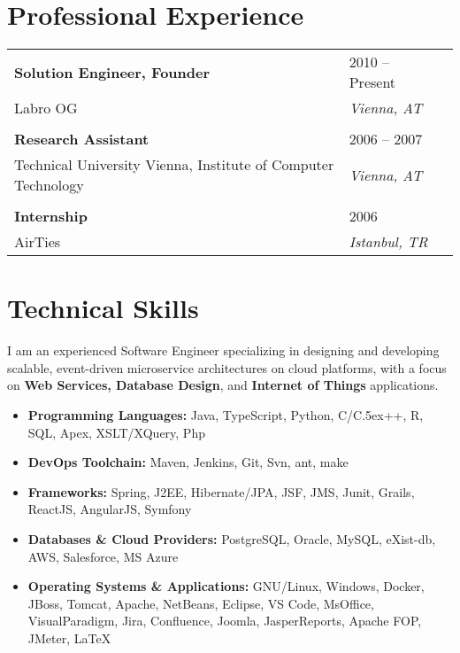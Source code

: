 \documentclass[11pt,a4paper,oneside]{article}
\def\Cplusplus{{\rm C\raise.5ex\hbox{\tiny ++}}}
\begin{document}

\section{\bf Professional Experience}
\begin{longtable}{  L{0.70\textwidth}  R{0.25\textwidth}  R{0.05\textwidth }} 
\textbf{Solution Engineer, Founder} & 2010 -- Present \\
Labro OG & \textit{Vienna, AT} \\
\vspace{1pt}\\
\textbf{Research Assistant} & 2006 -- 2007\\
Technical University Vienna, Institute of Computer Technology & \textit{Vienna, AT} \\
\vspace{1pt}\\
\textbf{Internship} & 2006\\
AirTies & \textit{Istanbul, TR} \\
\end{longtable}

\section{\bf Technical Skills}
\begin{adjustwidth}{1.5em}{2em}
I am an experienced Software Engineer specializing in designing and developing scalable, event-driven microservice architectures on cloud platforms, with a focus on  \textbf{Web Services, Database Design}, and  \textbf{Internet of Things} applications. 

\begin{itemize}[leftmargin=0em]
\item \textbf{Programming Languages:} Java, TypeScript, Python, C/\Cplusplus, R, SQL, Apex, XSLT/XQuery, Php
\item \textbf{DevOps Toolchain:} Maven, Jenkins, Git, Svn, ant, make
\item \textbf{Frameworks:} Spring, J2EE, Hibernate/JPA, JSF, JMS, Junit, Grails, ReactJS, AngularJS, Symfony
\item \textbf{Databases \& Cloud Providers:}  PostgreSQL, Oracle, MySQL, eXist-db, AWS, Salesforce, MS Azure
\item \textbf{Operating Systems \& Applications:}  GNU/Linux, Windows, Docker, JBoss, Tomcat, Apache, NetBeans, Eclipse, VS Code, MsOffice, VisualParadigm, Jira, Confluence, Joomla, JasperReports, Apache FOP, JMeter, \LaTeX
\end{itemize}
\end{adjustwidth}
\end{document}
